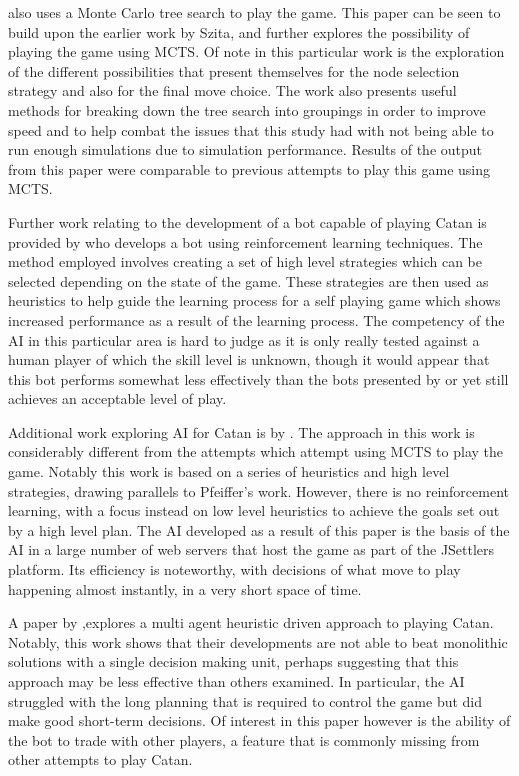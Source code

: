 \documentclass[]{article}
\begin{document}
\par \textcite{roelofs2012monte} also uses a Monte Carlo tree search to play the game. This paper can be seen to build upon the earlier work by Szita, and further explores the possibility of playing the game using MCTS. Of note in this particular work is the exploration of the different possibilities that present themselves for the node selection strategy and also for the final move choice. The work also presents useful methods for breaking down the tree search into groupings in order to improve speed and to help combat the issues that this study had with not being able to run enough simulations due to simulation performance. Results of the output from this paper were comparable to previous attempts to play this game using MCTS.

\par Further work relating to the development of a bot capable of playing Catan is provided by \textcite{pfeiffer2004reinforcement} who develops a bot using reinforcement learning techniques. The method employed involves creating a set of high level strategies which can be selected depending on the state of the game. These strategies are then used as heuristics to help guide the learning process for a self playing game which shows increased performance as a result of the learning process. The competency of the AI in this particular area is hard to judge as it is only really tested against a human player of which the skill level is unknown, though it would appear that this bot performs somewhat less effectively than the bots presented by \textcite{szita2009monte} or \textcite{roelofs2012monte} yet still achieves an acceptable level of play.

\par Additional work exploring AI for Catan is by \textcite{thomas2003real}. The approach in this work is considerably different from the attempts which attempt using MCTS to play the game. Notably this work is based on a series of heuristics and high level strategies, drawing parallels to Pfeiffer's work. However, there is no reinforcement learning, with a focus instead on low level heuristics to achieve the goals set out by a high level plan. The AI developed as a result of this paper is the basis of the AI in a large number of web servers that host the game as part of the JSettlers platform. Its efficiency is noteworthy, with decisions of what move to play happening almost instantly, in a very short space of time.

\par A paper by \textcite{branca2007using},explores a multi agent heuristic driven approach to playing Catan. Notably, this work shows that their developments are not able to beat monolithic solutions with a single decision making unit, perhaps suggesting that this approach may be less effective than others examined. In particular, the AI struggled with the long planning that is required to control the game but did make good short-term decisions. Of interest in this paper however is the ability of the bot to trade with other players, a feature that is commonly missing from other attempts to play Catan.
\end{document}
